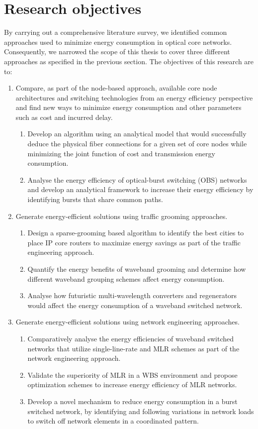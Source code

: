 \documentclass{article}
\begin{document}
\section{Research objectives}
By carrying out a comprehensive literature survey, we identified common approaches used to minimize energy consumption in optical core networks. Consequently, we narrowed the scope of this thesis to cover three different approaches as specified in the previous section.
The objectives of this research are to:
\begin{enumerate}
\item Compare, as part of the node-based approach, available core node architectures and switching technologies from an energy efficiency perspective and find new ways to minimize energy consumption and other parameters such as cost and incurred delay.
\begin{enumerate}[i]
\item Develop an algorithm using an analytical model that would successfully deduce the physical fiber connections for a given set of core nodes while minimizing the joint function of cost and transmission energy consumption. 
\item Analyse the energy efficiency of optical-burst switching (OBS) networks and develop an analytical framework to increase their energy efficiency by identifying bursts that share common paths.
\end{enumerate}
\item Generate energy-efficient solutions using traffic grooming approaches.
\begin{enumerate}[i]
\item Design a sparse-grooming \cite{Srinivasan2009} based algorithm to identify the best cities to place IP core routers to maximize energy savings as part of the traffic engineering approach.
\item Quantify the energy benefits of waveband grooming and determine how different waveband grouping schemes affect energy consumption.
\item Analyse how futuristic multi-wavelength converters and regenerators would affect the energy consumption of a waveband switched network.
\end{enumerate} 
\item Generate energy-efficient solutions using network engineering approaches.
\begin{enumerate}[i]
\item Comparatively analyse the energy efficiencies of waveband switched networks that utilize single-line-rate and MLR schemes as part of the network engineering approach. 
\item Validate the superiority of MLR in a WBS environment and propose optimization schemes to increase energy efficiency of MLR networks.
\item Develop a novel mechanism to reduce energy consumption in a burst switched network, by identifying and following variations in network loads to switch off network elements in a coordinated pattern.
\end{enumerate}     
\end{enumerate}
\end{document}
